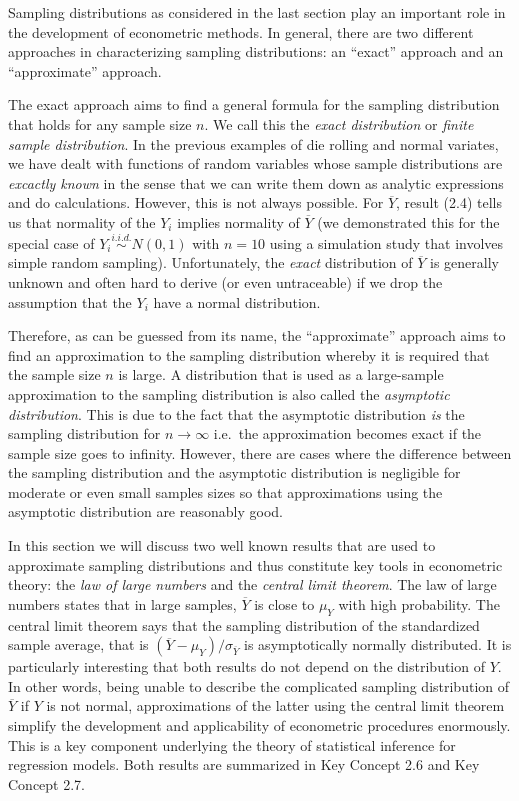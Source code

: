 \documentclass[]{book}
\theoremstyle{definition}
\theoremstyle{definition}
\theoremstyle{definition}
\theoremstyle{remark}
\begin{document}
Sampling distributions as considered in the last section play an
important role in the development of econometric methods. In general,
there are two different approaches in characterizing sampling
distributions: an ``exact'' approach and an ``approximate'' approach.

The exact approach aims to find a general formula for the sampling
distribution that holds for any sample size \(n\). We call this the
\emph{exact distribution} or \emph{finite sample distribution}. In the
previous examples of die rolling and normal variates, we have dealt with
functions of random variables whose sample distributions are
\emph{excactly known} in the sense that we can write them down as
analytic expressions and do calculations. However, this is not always
possible. For \(\overline{Y}\), result (2.4) tells us that normality of
the \(Y_i\) implies normality of \(\overline{Y}\) (we demonstrated this
for the special case of \(Y_i \overset{i.i.d.}{\sim} N(0,1)\) with
\(n=10\) using a simulation study that involves simple random sampling).
Unfortunately, the \emph{exact} distribution of \(\overline{Y}\) is
generally unknown and often hard to derive (or even untraceable) if we
drop the assumption that the \(Y_i\) have a normal distribution.

Therefore, as can be guessed from its name, the ``approximate'' approach
aims to find an approximation to the sampling distribution whereby it is
required that the sample size \(n\) is large. A distribution that is
used as a large-sample approximation to the sampling distribution is
also called the \emph{asymptotic distribution}. This is due to the fact
that the asymptotic distribution \emph{is} the sampling distribution for
\(n \rightarrow \infty\) i.e.~the approximation becomes exact if the
sample size goes to infinity. However, there are cases where the
difference between the sampling distribution and the asymptotic
distribution is negligible for moderate or even small samples sizes so
that approximations using the asymptotic distribution are reasonably
good.

In this section we will discuss two well known results that are used to
approximate sampling distributions and thus constitute key tools in
econometric theory: the \emph{law of large numbers} and the
\emph{central limit theorem}. The law of large numbers states that in
large samples, \(\overline{Y}\) is close to \(\mu_Y\) with high
probability. The central limit theorem says that the sampling
distribution of the standardized sample average, that is
\((\overline{Y} - \mu_Y)/\sigma_{\overline{Y}}\) is asymptotically
normally distributed. It is particularly interesting that both results
do not depend on the distribution of \(Y\). In other words, being unable
to describe the complicated sampling distribution of \(\overline{Y}\) if
\(Y\) is not normal, approximations of the latter using the central
limit theorem simplify the development and applicability of econometric
procedures enormously. This is a key component underlying the theory of
statistical inference for regression models. Both results are summarized
in Key Concept 2.6 and Key Concept 2.7.
\end{document}
